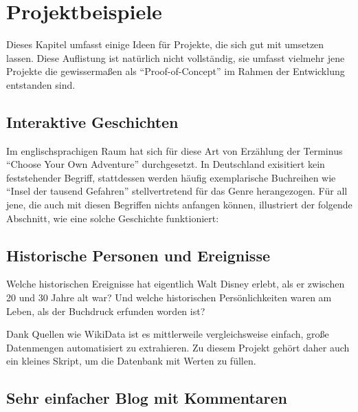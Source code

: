 \section{Projektbeispiele}
\label{sec:project-examples}

Dieses Kapitel umfasst einige Ideen für Projekte, die sich gut mit \textbf{\idename} umsetzen lassen. Diese Auflistung ist natürlich nicht vollständig, sie umfasst vielmehr jene Projekte die gewissermaßen als ``Proof-of-Concept'' im Rahmen der Entwicklung entstanden sind.


\subsection{Interaktive Geschichten}

Im englischsprachigen Raum hat sich für diese Art von Erzählung der Terminus ``Choose Your Own Adventure'' durchgesetzt. In Deutschland exisitiert kein feststehender Begriff, stattdessen werden häufig exemplarische Buchreihen wie ``Insel der tausend Gefahren'' stellvertretend für das Genre herangezogen. Für all jene, die auch mit diesen Begriffen nichts anfangen können, illustriert der folgende Abschnitt, wie eine solche Geschichte funktioniert:


\subsection{Historische Personen und Ereignisse}

Welche historischen Ereignisse hat eigentlich Walt Disney erlebt, als er zwischen 20 und 30 Jahre alt war? Und welche historischen Persönlichkeiten waren am Leben, als der Buchdruck erfunden worden ist?

Dank Quellen wie WikiData ist es mittlerweile vergleichsweise einfach, große Datenmengen automatisiert zu extrahieren. Zu diesem Projekt gehört daher auch ein kleines Skript, um die Datenbank mit Werten zu füllen.

\subsection{Sehr einfacher Blog mit Kommentaren}

